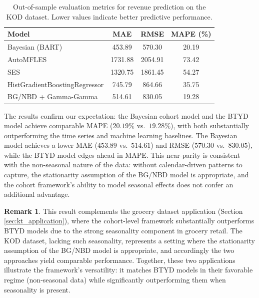 \documentclass[11pt]{amsart}
\theoremstyle{definition}
\newtheorem{remark}{Remark}
\begin{document}
\begin{table}[H]
    \centering
    \caption{Out-of-sample evaluation metrics for revenue prediction on the KOD dataset. Lower values indicate
        better predictive performance.}
    \label{tab:kod_metrics}
    \begin{tabular}{lccc}
        \hline
        \textbf{Model}                        & \textbf{MAE} & \textbf{RMSE} & \textbf{MAPE (\%)} \\
        \hline
        Bayesian (BART)                       & 453.89       & 570.30        & 20.19              \\
        AutoMFLES                             & 1731.88      & 2054.91       & 73.42              \\
        SES                                   & 1320.75      & 1861.45       & 54.27              \\
        HistGradientBoostingRegressor         & 745.79       & 864.66        & 35.75              \\
        BG/NBD + Gamma-Gamma                  & 514.61       & 830.05        & 19.28              \\
        \hline
    \end{tabular}
\end{table}

The results confirm our expectation: the Bayesian cohort model and the BTYD model achieve comparable MAPE
($20.19\%$ vs.\ $19.28\%$), with both substantially outperforming the time series and machine learning baselines.
The Bayesian model achieves a lower MAE ($453.89$ vs.\ $514.61$) and RMSE ($570.30$ vs.\ $830.05$), while
the BTYD model edges ahead in MAPE. This near-parity is consistent with the non-seasonal nature of the data:
without calendar-driven patterns to capture, the stationarity assumption of the BG/NBD model is appropriate,
and the cohort framework's ability to model seasonal effects does not confer an additional advantage.

\begin{remark}
This result complements the grocery dataset application (Section \ref{sec:kt_application}), where the
cohort-level framework substantially outperforms BTYD models due to the strong seasonality component in
grocery retail. The KOD dataset, lacking such seasonality, represents a setting where the stationarity
assumption of the BG/NBD model is appropriate, and accordingly the two approaches yield comparable
performance. Together, these two applications illustrate the framework's versatility: it matches BTYD
models in their favorable regime (non-seasonal data) while significantly outperforming them when
seasonality is present.
\end{remark}
\end{document}
